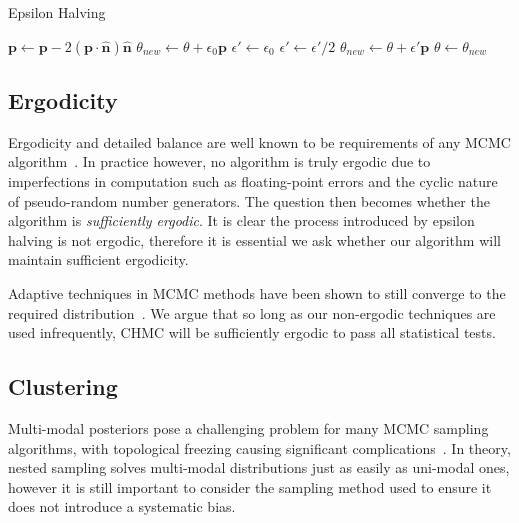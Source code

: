 \documentclass[11pt]{article}
\begin{document}
    \begin{algorithm}
        \caption{Epsilon Halving}
        \label{alg:epsilon_halving}
        \begin{algorithmic}
            \STATE {}
            \STATE $\mathbf{p} \gets \mathbf{p} - 2 \left(\mathbf{p} \cdot \hat{ \mathbf{n} } \right) \hat{ \mathbf{n} }$
            \STATE
            \STATE $ \theta_{new} \gets \theta + \epsilon_0 \mathbf{p}$
            \STATE $ \epsilon' \gets \epsilon_0$
            \STATE
                \STATE $\epsilon' \gets \epsilon' / 2$
                \STATE $ \theta_{new} \gets \theta + \epsilon' \mathbf{p}$
            \ENDWHILE
            \STATE
            \STATE $\theta \gets \theta_{new}$
        \end{algorithmic}
    \end{algorithm}


\subsection{Ergodicity}\label{subsec:ergodicity}
    Ergodicity and detailed balance are well known to be requirements of any MCMC algorithm~\cite{Metropolis_OG}.
    In practice however, no algorithm is truly ergodic due to imperfections in computation such as floating-point
    errors and the cyclic nature of pseudo-random number generators.
    The question then becomes whether the algorithm is \emph{sufficiently ergodic}.
    It is clear the process introduced by epsilon halving is not ergodic, therefore it is essential we ask
    whether our algorithm will maintain sufficient ergodicity.

    Adaptive techniques in MCMC methods have been shown to still converge to the required
    distribution~\cite{MCMC_Ergodicity}.
    We argue that so long as our non-ergodic techniques are used infrequently, CHMC will be sufficiently
    ergodic to pass all statistical tests.

\subsection{Clustering}\label{subsec:clustering}

    Multi-modal posteriors pose a challenging problem for many MCMC sampling algorithms, with topological freezing
    causing significant complications~\cite{mangoubi2018_HMC_Multimodal}.
    In theory, nested sampling solves multi-modal distributions just as easily as uni-modal ones, however it is
    still important to consider the sampling method used to ensure it does not introduce a systematic bias.
\end{document}

